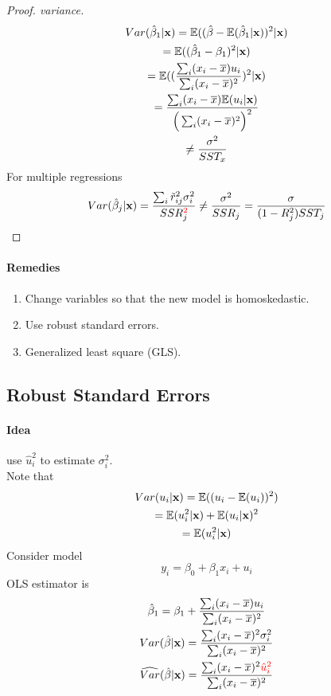 \documentclass[]{article}
\begin{document}
		\begin{proof}[Proof. variance]
			\begin{gather*}
				Var(\hat{\beta}_1 | \textbf{x}) = \mathbb{E}({(\hat{\beta} - \mathbb{E}({\hat{\beta}_1 | \textbf{x}}))^2 | \textbf{x}}) \\
				= \mathbb{E}({(\hat{\beta}_1 - \beta_1)^2 | \textbf{x}}) \\
				= \mathbb{E}({(\frac{\sum_i (x_i - \overline{x})u_i}{\sum_i (x_i - \overline{x})^2})^2|\textbf{x}}) \\
				= \frac{\sum_i(x_i - \overline{x}) \mathbb{E}({u_i | \textbf{x}})}{\Big( \sum_i (x_i - \overline{x})^2 \Big)^2} \\
				\neq \frac{\sigma^2}{SST_x}
			\end{gather*}
			For multiple regressions
			\begin{gather*}
				Var(\hat{\beta}_j | \textbf{x}) = \frac{\sum_i{\tilde{r}_{ij}^2 \sigma_i^2}}{SSR_j^{\textcolor{red}{2}}} \neq \frac{\sigma^2}{SSR_j} = \frac{\sigma}{(1-R^2_j)SST_j}
			\end{gather*}
		\end{proof}
		
		\paragraph{Remedies}
		\begin{enumerate}
			\item Change variables so that the new model is homoskedastic.
			\item Use robust standard errors.
			\item Generalized least square (GLS).
		\end{enumerate}
		
		\subsection{Robust Standard Errors}
			\paragraph{Idea} use $\hat{u}_i^2$ to estimate $\sigma_i^2$.\\
			Note that  
			\begin{gather*}
				Var(u_i | \textbf{x}) = \mathbb{E}({(u_i - \mathbb{E}({u_i}))^2}) \\
				= \mathbb{E}({u_i^2 | \textbf{x}}) + \mathbb{E}({u_i | \textbf{x}})^2 \\
				= \mathbb{E}({u_i^2 | \textbf{x}})
			\end{gather*}
			Consider model 
			\[
				y_i = \beta_0 + \beta_1 x_i + u_i
			\]
			OLS estimator is 
			\begin{gather*}
				\hat{\beta}_1 = \beta_1 + \frac{\sum_i (x_i - \overline{x})u_i}{\sum_i (x_i - \overline{x})^2} \\
				Var(\hat{\beta} | \textbf{x}) = \frac{\sum_i(x_i - \overline{x})^2 \sigma_i^2}{\sum_i(x_i - \overline{x})^2} \\
				\widehat{Var}(\hat{\beta} | \textbf{x}) = \frac{\sum_i(x_i - \overline{x})^2 \textcolor{red}{\hat{u}_i^2}}{\sum_i(x_i - \overline{x})^2}
			\end{gather*}
\end{document}
